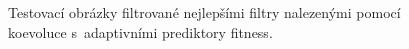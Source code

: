 \documentclass[czech]{ExcelAtFIT} %
\begin{document}
\begin{figure}[b!]
{    }\hfill
    \hfill
    \caption{Testovací obrázky filtrované nejlepšími filtry nalezenými pomocí koevoluce s~adaptivními prediktory fitness.}
    \label{fig:BestImages}
\end{figure}
\end{document}
